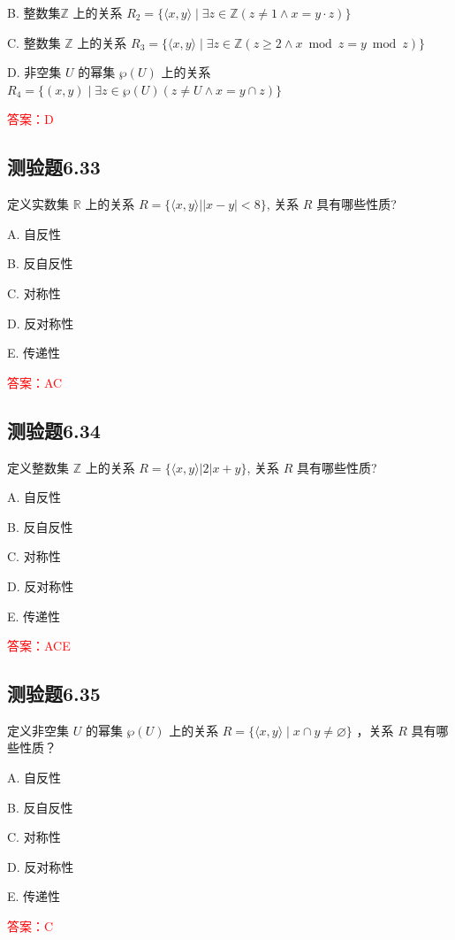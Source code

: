 \documentclass[UTF8, heading=true]{ctexart}
\begin{document}
B. 整数集$\mathbb{Z}$ 上的关系 $R_2=\{\langle x, y\rangle \mid \exists z \in \mathbb{Z}(z \neq 1 \wedge x=y \cdot z)\}$

C. 整数集 $\mathbb{Z}$ 上的关系 $R_3=\{\langle x, y\rangle \mid \exists z \in \mathbb{Z}(z \geq 2 \wedge x \bmod z=y \bmod z)\}$

D. 非空集 $U$ 的幂集 $\wp(U)$ 上的关系 $R_4=\{(x, y) \mid \exists z \in \wp(U)(z \neq U \wedge x=y \cap z)\}$

\textcolor{red}{答案：D}


\subsection{测验题6.33}
定义实数集 $\mathbb{R}$ 上的关系 $R=\{\langle x, y\rangle| | x-y \mid<8\}$, 关系 $R$ 具有哪些性质?

A. 
自反性

B. 
反自反性

C. 
对称性

D. 
反对称性

E. 
传递性

\textcolor{red}{答案：AC}

\subsection{测验题6.34}

定义整数集 $\mathbb{Z}$ 上的关系 $R=\{\langle x, y\rangle|2| x+y\}$, 关系 $R$ 具有哪些性质?

A. 
自反性

B. 
反自反性

C. 
对称性

D. 
反对称性

E. 
传递性

\textcolor{red}{答案：ACE}

\subsection{测验题6.35}

定义非空集 $U$ 的幂集 $\wp(U)$ 上的关系 $R=\{\langle x, y\rangle \mid x \cap y \neq \varnothing\}$ ，关系 $R$ 具有哪些性质？

A. 自反性

B. 反自反性

C. 对称性

D. 反对称性

E. 传递性

\textcolor{red}{答案：C}
\end{document}
